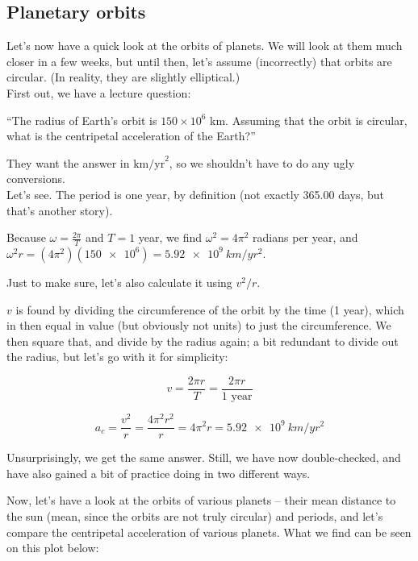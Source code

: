 \documentclass[12pt,a4paper]{report}
\begin{document}
\subsection{Planetary orbits}

Let's now have a quick look at the orbits of planets. We will look at them much closer in a few weeks, but until then, let's assume (incorrectly) that orbits are circular. (In reality, they are slightly elliptical.)\\
First out, we have a lecture question:

``The radius of Earth's orbit is $150 \times 10^6$ km. Assuming that the orbit is circular, what is the centripetal acceleration of the Earth?''

They want the answer in $\text{km/yr}^2$, so we shouldn't have to do any ugly conversions.\\
Let's see. The period is one year, by definition (not exactly 365.00 days, but that's another story).

Because $\omega = \frac{2\pi}{T}$ and $T = 1$ year, we find $\omega^2 = 4\pi^2$ radians per year, and $\omega^2 r = (4 \pi^2)(\num{150e6}) = \SI{5.92e9}{km/yr^2}$.

Just to make sure, let's also calculate it using $v^2/r$.

$v$ is found by dividing the circumference of the orbit by the time (1 year), which in then equal in value (but obviously not units) to just the circumference. We then square that, and divide by the radius again; a bit redundant to divide out the radius, but let's go with it for simplicity:

\begin{equation}
v = \frac{2 \pi r}{T} = \frac{2 \pi r}{1 \text{ year}}
\end{equation}

\begin{equation}
a_c = \frac{v^2}{r} = \frac{4 \pi^2 r^2}{r} = 4 \pi^2 r = \SI{5.92e9}{km/yr^2}
\end{equation}

Unsurprisingly, we get the same answer. Still, we have now double-checked, and have also gained a bit of practice doing in two different ways.

Now, let's have a look at the orbits of various planets -- their mean distance to the sun (mean, since the orbits are not truly circular) and periods, and let's compare the centripetal acceleration of various planets. What we find can be seen on this plot below:
\end{document}
